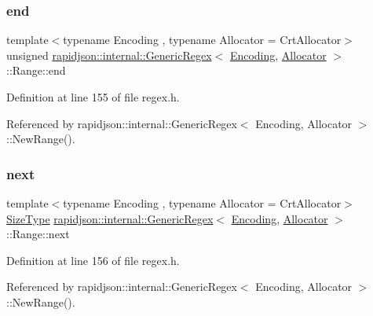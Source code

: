 \subsubsection{\texorpdfstring{end}{end}}
{\footnotesize\ttfamily template$<$typename Encoding , typename Allocator  = Crt\+Allocator$>$ \\
unsigned \mbox{\hyperlink{classrapidjson_1_1internal_1_1_generic_regex}{rapidjson\+::internal\+::\+Generic\+Regex}}$<$ \mbox{\hyperlink{classrapidjson_1_1_encoding}{Encoding}}, \mbox{\hyperlink{classrapidjson_1_1_allocator}{Allocator}} $>$\+::Range\+::end}



Definition at line 155 of file regex.\+h.



Referenced by rapidjson\+::internal\+::\+Generic\+Regex$<$ Encoding, Allocator $>$\+::\+New\+Range().

\mbox{\label{structrapidjson_1_1internal_1_1_generic_regex_1_1_range_a1b83a687c40d250e9bcd2aa9910e4b17}} 
\subsubsection{\texorpdfstring{next}{next}}
{\footnotesize\ttfamily template$<$typename Encoding , typename Allocator  = Crt\+Allocator$>$ \\
\mbox{\hyperlink{namespacerapidjson_a44eb33eaa523e36d466b1ced64b85c84}{Size\+Type}} \mbox{\hyperlink{classrapidjson_1_1internal_1_1_generic_regex}{rapidjson\+::internal\+::\+Generic\+Regex}}$<$ \mbox{\hyperlink{classrapidjson_1_1_encoding}{Encoding}}, \mbox{\hyperlink{classrapidjson_1_1_allocator}{Allocator}} $>$\+::Range\+::next}



Definition at line 156 of file regex.\+h.



Referenced by rapidjson\+::internal\+::\+Generic\+Regex$<$ Encoding, Allocator $>$\+::\+New\+Range().

\mbox{\label{structrapidjson_1_1internal_1_1_generic_regex_1_1_range_a9dedd537843ac66dbef1c87892aa9f7d}} 
